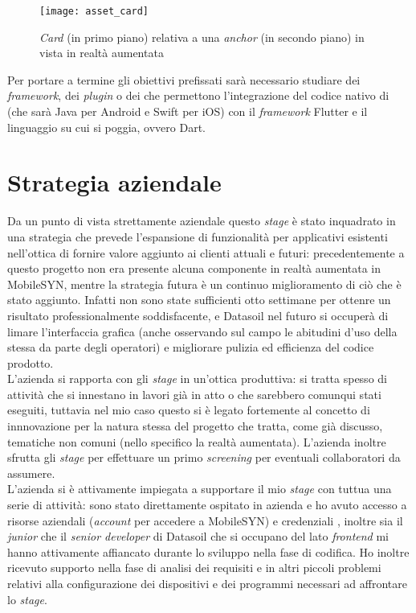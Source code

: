 \begin{figure}[ht]
    \centering
    \texttt{[image: asset\_card]}
    \caption{\textit{Card} (in primo piano) relativa a una \textit{anchor} (in secondo piano) in vista in realtà aumentata}
\end{figure}

Per portare a termine gli obiettivi prefissati sarà necessario studiare dei \textit{framework}, dei \textit{plugin} o dei \sdk{} che permettono l'integrazione del codice nativo di \asa{} (che sarà Java per Android e Swift per iOS) con il \textit{framework} Flutter e il linguaggio su cui si poggia, ovvero Dart. 

\section{Strategia aziendale}
Da un punto di vista strettamente aziendale questo \textit{stage} è stato inquadrato in una strategia che prevede l'espansione di funzionalità per applicativi esistenti nell'ottica di fornire valore aggiunto ai clienti attuali e futuri: precedentemente a questo progetto non era presente alcuna componente in realtà aumentata in MobileSYN, mentre la strategia futura è un continuo miglioramento di ciò che è stato aggiunto. Infatti non sono state sufficienti otto settimane per ottenre un risultato professionalmente soddisfacente, e Datasoil nel futuro si occuperà di limare l'interfaccia grafica (anche osservando sul campo le abitudini d'uso della stessa da parte degli operatori) e migliorare pulizia ed efficienza del codice prodotto.\\
L'azienda si rapporta con gli \textit{stage} in un'ottica produttiva: si tratta spesso di attività che si innestano in lavori già in atto o che sarebbero comunqui stati eseguiti, tuttavia nel mio caso questo si è legato fortemente al concetto di innnovazione per la natura stessa del progetto che tratta, come già discusso, tematiche non comuni (nello specifico la realtà aumentata). L'azienda inoltre sfrutta gli \textit{stage} per effettuare un primo \textit{screening} per eventuali collaboratori da assumere.\\
L'azienda si è attivamente impiegata a supportare il mio \textit{stage} con tuttua una serie di attività: sono stato direttamente ospitato in azienda e ho avuto accesso a risorse aziendali (\textit{account} \aws{} per accedere a MobileSYN) e credenziali \asa{}, inoltre sia il \textit{junior} che il \textit{senior developer} di Datasoil che si occupano del lato \textit{frontend} mi hanno attivamente affiancato durante lo sviluppo nella fase di codifica. Ho inoltre ricevuto supporto nella fase di analisi dei requisiti e in altri piccoli problemi relativi alla configurazione dei dispositivi e dei programmi necessari ad affrontare lo \textit{stage}.

